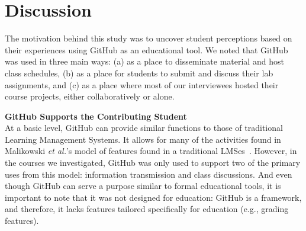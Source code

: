 \section{Discussion}
The motivation behind this study was to uncover student perceptions based on their experiences using GitHub as an educational tool. We noted that GitHub was used in three main ways: (a) as a place to disseminate material and host class schedules, (b) as a place for students to submit and discuss their lab assignments, and (c) as a place where most of our interviewees hosted their course projects, either collaboratively or alone.




\textbf{GitHub Supports the Contributing Student} \\
At a basic level, GitHub can provide similar functions to those of traditional Learning Management Systems. It allows for many of the activities found in Malikowski \textit{et al.}'s model of features found in a traditional LMSes~\cite{malikowski2007model}. However, in the courses we investigated, GitHub was only used to support two of the primary uses from this model: information transmission and class discussions. And even though GitHub can serve a purpose similar to formal educational tools, it is important to note that it was not designed for education: GitHub is a framework, and therefore, it lacks features tailored specifically for education (e.g., grading features).

